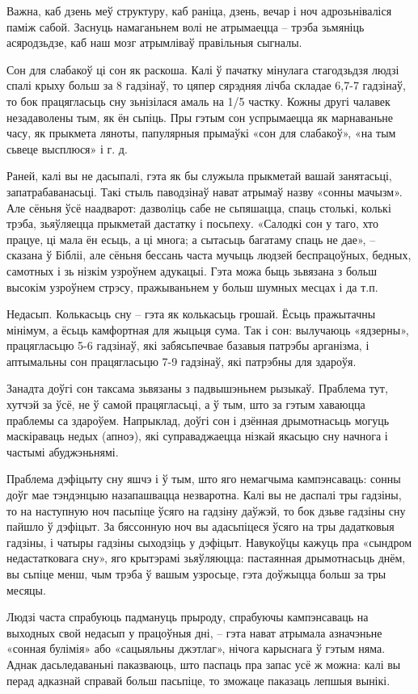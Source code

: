 Важна, каб дзень меў структуру, каб раніца, дзень, вечар і ноч адрозьніваліся паміж сабой. Заснуць намаганьнем волі не атрымаецца – трэба зьмяніць асяродзьдзе, каб наш мозг атрымліваў правільныя сыгналы.

Сон для слабакоў ці сон як раскоша. Калі ў пачатку мінулага стагодзьдзя людзі спалі крыху больш за 8 гадзінаў, то цяпер сярэдняя лічба складае 6,7-7 гадзінаў, то бок працягласьць сну зьнізілася амаль на 1/5 частку. Кожны другі чалавек незадаволены тым, як ён сьпіць. Пры гэтым сон успрымаецца як марнаваньне часу, як прыкмета ляноты, папулярныя прымаўкі «сон для слабакоў», «на тым сьвеце высплюся» і г. д.

Раней, калі вы не дасыпалі, гэта як бы служыла прыкметай вашай занятасьці, запатрабаванасьці. Такі стыль паводзінаў нават атрымаў назву «сонны мачызм». Але сёньня ўсё наадварот: дазволіць сабе не сьпяшацца, спаць столькі, колькі трэба, зьяўляецца прыкметай дастатку і посьпеху. «Салодкі сон у таго, хто працуе, ці мала ён есьць, а ці многа; а сытасьць багатаму спаць не дае», – сказана ў Бібліі, але сёньня бессань часта мучыць людзей беспрацоўных, бедных, самотных і зь нізкім узроўнем адукацыі. Гэта можа быць зьвязана з больш высокім узроўнем стрэсу, пражываньнем у больш шумных месцах і да т.п.

Недасып. Колькасьць сну – гэта як колькасьць грошай. Ёсьць пражытачны мінімум, а ёсьць камфортная для жыцьця сума. Так і сон: вылучаюць «ядзерны», працягласьцю 5-6 гадзінаў, які забясьпечвае базавыя патрэбы арганізма, і аптымальны сон працягласьцю 7-9 гадзінаў, які патрэбны для здароўя.

Занадта доўгі сон таксама зьвязаны з падвышэньнем рызыкаў. Праблема тут, хутчэй за ўсё, не ў самой працягласьці, а ў тым, што за гэтым хаваюцца праблемы са здароўем. Напрыклад, доўгі сон і дзённая дрымотнасьць могуць маскіраваць недых (апноэ), які суправаджаецца нізкай якасьцю сну начнога і частымі абуджэньнямі.

Праблема дэфіцыту сну яшчэ і ў тым, што яго немагчыма кампэнсаваць: сонны доўг мае тэндэнцыю назапашвацца незваротна. Калі вы не даспалі тры гадзіны, то на наступную ноч пасьпіце ўсяго на гадзіну даўжэй, то бок дзьве гадзіны сну пайшло ў дэфіцыт. За бяссонную ноч вы адасьпіцеся ўсяго на тры дадатковыя гадзіны, і чатыры гадзіны сыходзіць у дэфіцыт. Навукоўцы кажуць пра «сындром недастатковага сну», яго крытэрамі зьяўляюцца: пастаянная дрымотнасьць днём, вы сьпіце менш, чым трэба ў вашым узросьце, гэта доўжыцца больш за тры месяцы.

Людзі часта спрабуюць падмануць прыроду, спрабуючы кампэнсаваць на выходных свой недасып у працоўныя дні, – гэта нават атрымала азначэньне «сонная булімія» або «сацыяльны джэтлаг», нічога карыснага ў гэтым няма. Аднак дасьледаваньні паказваюць, што паспаць пра запас усё ж можна: калі вы перад адказнай справай больш пасьпіце, то зможаце паказаць лепшыя вынікі.

